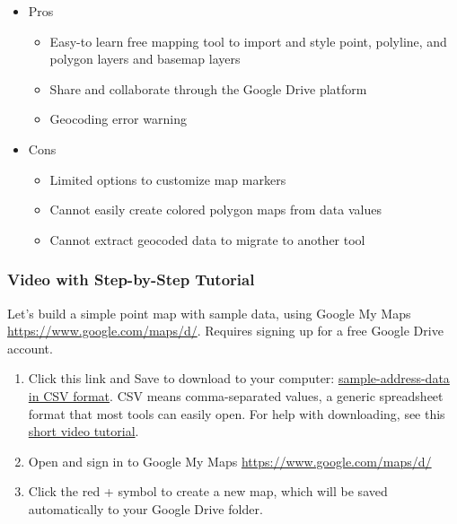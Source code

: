 \documentclass[
  english,
]{book}
\providecommand{\tightlist}{%
  \setlength{\itemsep}{0pt}\setlength{\parskip}{0pt}}
\begin{document}
\begin{itemize}
\tightlist
\item
  Pros

  \begin{itemize}
  \tightlist
  \item
    Easy-to learn free mapping tool to import and style point, polyline, and polygon layers and basemap layers
  \item
    Share and collaborate through the Google Drive platform
  \item
    Geocoding error warning
  \end{itemize}
\item
  Cons

  \begin{itemize}
  \tightlist
  \item
    Limited options to customize map markers
  \item
    Cannot easily create colored polygon maps from data values
  \item
    Cannot extract geocoded data to migrate to another tool
  \end{itemize}
\end{itemize}

\hypertarget{video-with-step-by-step-tutorial-3}{%
\subsubsection*{Video with Step-by-Step Tutorial}\label{video-with-step-by-step-tutorial-3}}

Let's build a simple point map with sample data, using Google My Maps \url{https://www.google.com/maps/d/}. Requires signing up for a free Google Drive account.

\begin{enumerate}
\def\labelenumi{\arabic{enumi})}
\item
  Click this link and Save to download to your computer: \href{data/sample-address-data.csv}{sample-address-data in CSV format}. CSV means comma-separated values, a generic spreadsheet format that most tools can easily open. For help with downloading, see this \href{https://www.youtube.com/watch?v=-04PQldP9HQ}{short video tutorial}.
\item
  Open and sign in to Google My Maps \url{https://www.google.com/maps/d/}
\item
  Click the red + symbol to create a new map, which will be saved automatically to your Google Drive folder.
\end{enumerate}
\end{document}
